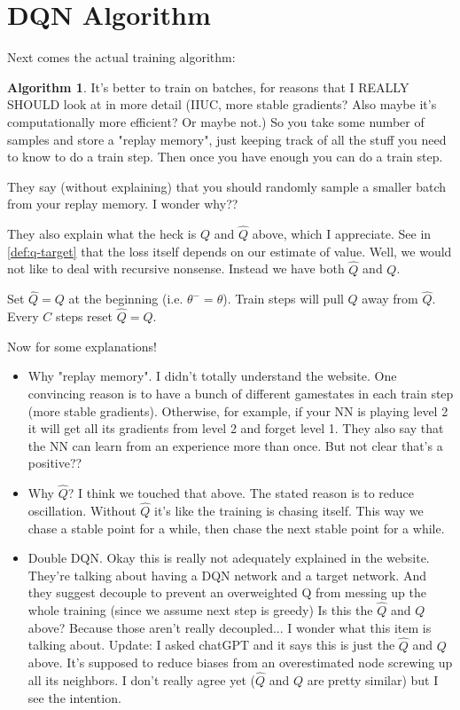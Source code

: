 \documentclass[11pt,notitlepage]{report}
\theoremstyle{definition}
\newtheorem{algorithm}{Algorithm}
\theoremstyle{plain}
\begin{document}
\section{DQN Algorithm}
Next comes the actual training algorithm:
\begin{algorithm}
It's better to train on batches, for reasons that I REALLY SHOULD look at in more detail
(IIUC, more stable gradients? Also maybe it's computationally more efficient? Or maybe not.)
So you take some number of samples and store a "replay memory", just keeping track of all
the stuff you need to know to do a train step. Then once you have enough you can do a train step.

They say (without explaining) that you should randomly sample a smaller batch from your replay
memory. I wonder why??

They also explain what the heck is $Q$ and $\hat{Q}$ above, which I appreciate.
See in \ref{def:q-target} that the loss itself depends on our estimate of value.
Well, we would not like to deal with recursive nonsense. Instead we have
both $\hat{Q}$ and $Q$.

Set $\hat{Q} = Q$ at the beginning (i.e. $\theta^- = \theta$). Train steps will
pull $Q$ away from $\hat{Q}$. Every $C$ steps reset $\hat{Q} = Q$.
\end{algorithm}

Now for some explanations!
\begin{itemize}
\item Why "replay memory". I didn't totally understand the website. One convincing reason is to have a bunch of different gamestates in each train step (more stable gradients). Otherwise, for example, if your NN is playing level 2 it will get all its gradients from level 2 and forget level 1. They also say that the NN can learn from an experience more than once. But not clear that's a positive??
\item Why $\hat{Q}$? I think we touched that above. The stated reason is to reduce oscillation. Without $\hat{Q}$ it's like the training is chasing itself. This way we chase a stable point for a while, then chase the next stable point for a while.
\item Double DQN. Okay this is really not adequately explained in the website. They're talking about having a DQN network and a target network. And they suggest decouple to prevent an overweighted Q from messing up the whole training (since we assume next step is greedy)
Is this the $\hat{Q}$ and $Q$ above? Because those aren't really decoupled... I wonder what this item is talking about.
Update: I asked chatGPT and it says this is just the $\hat{Q}$ and $Q$ above. It's supposed to reduce biases from an overestimated node screwing up all its neighbors.
I don't really agree yet ($\hat{Q}$ and $Q$ are pretty similar) but I see the intention.
\end{itemize}
\end{document}
